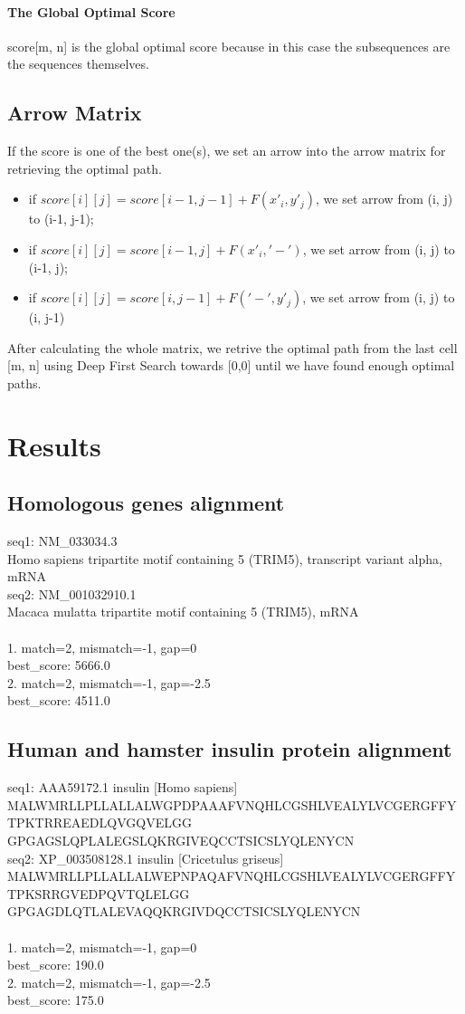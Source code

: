 \documentclass[a4paper, 12pt, one column]{article}
\begin{document}
\paragraph{The Global Optimal Score}
score[m, n] is the global optimal score because in this case the subsequences are the sequences themselves.
\subsection{Arrow Matrix}
If the score is one of the best one(s), we set an arrow into the arrow matrix for retrieving the optimal path.
\begin{itemize}
    \item if $score[i][j] = score[i-1, j-1] + F(x'_i, y'_j)$, we set arrow from (i, j) to (i-1, j-1);
    \item if $score[i][j] = score[i-1, j] + F(x'_i, '-')$, we set arrow from (i, j) to (i-1, j);
    \item if $score[i][j] = score[i, j-1] + F('-', y'_j)$, we set arrow from (i, j) to (i, j-1)
\end{itemize}
After calculating the whole matrix, we retrive the optimal path from the last cell [m, n] using Deep First Search towards [0,0] until we have found enough optimal paths. 
\section{Results}
\subsection*{Homologous genes alignment}
seq1: NM\_033034.3\\
Homo sapiens tripartite motif containing 5 (TRIM5), transcript variant alpha, mRNA\\
seq2: NM\_001032910.1\\
Macaca mulatta tripartite motif containing 5 (TRIM5), mRNA\\
\\
1. match=2, mismatch=-1, gap=0\\
best\_score: 5666.0\\
2. match=2, mismatch=-1, gap=-2.5\\
best\_score: 4511.0\\
\subsection*{Human and hamster insulin protein alignment}
seq1: AAA59172.1 insulin [Homo sapiens]\\
MALWMRLLPLLALLALWGPDPAAAFVNQHLCGSHLVEALYLVCGERGFFYTPKTRREAEDLQVGQVELGG
GPGAGSLQPLALEGSLQKRGIVEQCCTSICSLYQLENYCN\\
seq2: XP\_003508128.1 insulin [Cricetulus griseus]\\
MALWMRLLPLLALLALWEPNPAQAFVNQHLCGSHLVEALYLVCGERGFFYTPKSRRGVEDPQVTQLELGG
GPGAGDLQTLALEVAQQKRGIVDQCCTSICSLYQLENYCN\\
\\
1. match=2, mismatch=-1, gap=0\\
best\_score: 190.0\\
2. match=2, mismatch=-1, gap=-2.5\\
best\_score: 175.0\\
\end{document}
